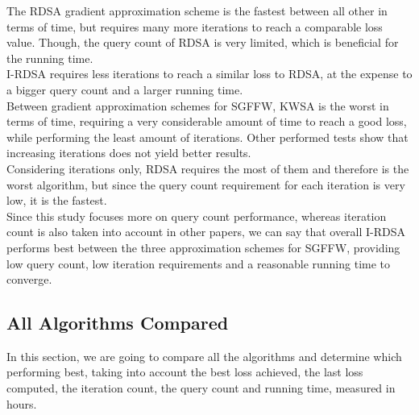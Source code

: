 \documentclass[10pt,twocolumn,letterpaper]{article}
\begin{document}
The RDSA gradient approximation scheme is the fastest between all other 
in terms of time, but requires many more iterations to reach a comparable loss value.
Though, the query count of RDSA is very limited, which is beneficial for the running time.\\

I-RDSA requires less iterations to reach a similar loss to RDSA, at the expense to a bigger query
count and a larger running time. \\

Between gradient approximation schemes for SGFFW, KWSA is the worst in terms of time, requiring
a very considerable amount of time to reach a good loss, while performing the least amount of iterations.
Other performed tests show that increasing iterations does not yield better results. \\

Considering iterations only, RDSA requires the most of them and therefore is the worst algorithm, 
but since the query count requirement for each iteration is very low, it is the fastest. \\

Since this study focuses more on query count performance, whereas iteration count is also taken into account
in other papers, we can say that overall I-RDSA performs best between the three approximation schemes for SGFFW,
providing low query count, low iteration requirements and a reasonable running time to converge.


\subsection{All Algorithms Compared}

In this section, we are going to compare all the algorithms and determine which performing best,
taking into account the best loss achieved, the last loss computed, 
the iteration count, the query count and running time, measured in hours.
\end{document}
